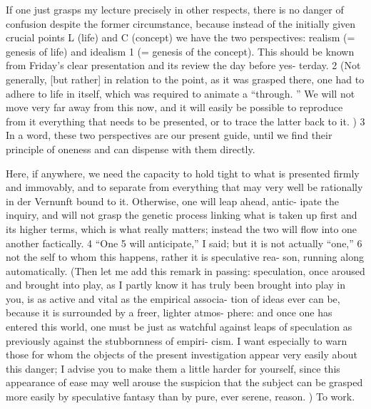 If one just grasps my lecture precisely in other respects, there is no danger of
confusion despite the former circumstance, because instead of the initially
given crucial points L (life) and C (concept) we have the two perspectives:
realism (= genesis of life) and idealism 1 (= genesis of the concept).
This should
be known from Friday’s clear presentation and its review the day before yes-
terday.
2 (Not generally, [but rather] in relation to the point, as it was grasped
there, one had to adhere to life in itself, which was required to animate a
“through.
” We will not move very far away from this now, and it will easily be
possible to reproduce from it everything that needs to be presented, or to trace
the latter back to it.
) 3 In a word, these two perspectives are our present guide,
until we find their principle of oneness and can dispense with them directly.

Here, if anywhere, we need the capacity to hold tight to what is presented
firmly and immovably, and to separate from everything that may very well be
rationally {in der Vernunft} bound to it.
Otherwise, one will leap ahead, antic-
ipate the inquiry, and will not grasp the genetic process linking what is taken
up first and its higher terms, which is what really matters; instead the two will
flow into one another factically.
4 “One 5 will anticipate,” I said; but it is not
actually “one,” 6 not the self to whom this happens, rather it is speculative rea-
son, running along automatically.
(Then let me add this remark in passing:
speculation, once aroused and brought into play, as I partly know it has truly
been brought into play in you, is as active and vital as the empirical associa-
tion of ideas ever can be, because it is surrounded by a freer, lighter atmos-
phere: and once one has entered this world, one must be just as watchful
against leaps of speculation as previously against the stubbornness of empiri-
cism.
I want especially to warn those for whom the objects of the present
investigation appear very easily about this danger; I advise you to make them
a little harder for yourself, since this appearance of ease may well arouse the
suspicion that the subject can be grasped more easily by speculative fantasy
than by pure, ever serene, reason.
)
To work.

